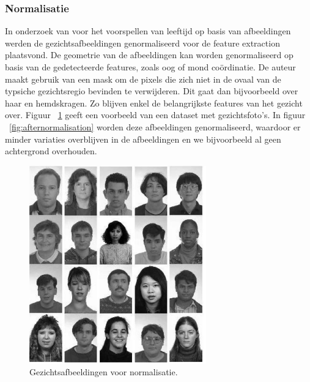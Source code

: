 \subsubsection{Normalisatie}
In onderzoek van \autocite{Chen2011} voor het voorspellen van leeftijd op basis van afbeeldingen werden de gezichtsafbeeldingen genormaliseerd voor de feature extraction plaatsvond. De geometrie van de afbeeldingen kan worden genormaliseerd op basis van de gedetecteerde features, zoals oog of mond coördinatie. De auteur maakt gebruik van een mask om de pixels die zich niet in de ovaal van de typsiche gezichtsregio bevinden te verwijderen. Dit gaat dan bijvoorbeeld over haar en hemdskragen. Zo blijven enkel de belangrijkste features van het gezicht over. Figuur {~\ref{fig:beforenormalisation}} geeft een voorbeeld van een dataset met gezichtsfoto's. In figuur {~\ref{fig:afternormalisation}} worden deze afbeeldingen genormaliseerd, waardoor er minder variaties overblijven in de afbeeldingen en we bijvoorbeeld al geen achtergrond overhouden.
\begin{figure}
    \centering
    \includegraphics[width=\columnwidth]{graphics/beforenorm.PNG}
    \caption{\label{fig:beforenormalisation}Gezichtsafbeeldingen voor normalisatie\autocite{Chen2011}.}
\end{figure}
